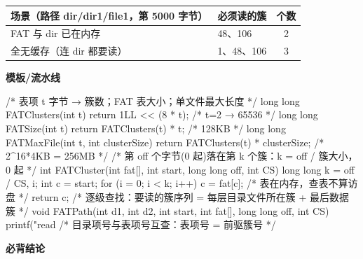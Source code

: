 \documentclass[10pt,a4paper]{ctexart}
\begin{document}
\begin{center}\small
\begin{tabularx}{\linewidth}{@{}>{\raggedright\arraybackslash}Xlc@{}}
\toprule
场景（路径 dir/dir1/file1，第 5000 字节） & 必须读的簇 & 个数 \\
\midrule
FAT 与 dir 已在内存 & 48、106 & 2 \\
全无缓存（连 dir 都要读） & 1、48、106 & 3 \\
\bottomrule
\end{tabularx}
\end{center}

\textbf{模板/流水线}

\begin{codebox}
/* 表项 t 字节 → 簇数；FAT 表大小；单文件最大长度 */
long long FATClusters(int t) { return 1LL << (8 * t); }        /* t=2 → 65536 */
long long FATSize(int t)     { return FATClusters(t) * t; }    /* 128KB */
long long FATMaxFile(int t, int clusterSize) {
    return FATClusters(t) * clusterSize;                       /* 2^16*4KB = 256MB */
}
/* 第 off 个字节(0 起)落在第 k 个簇：k = off / 簇大小，0 起 */
int FATCluster(int fat[], int start, long long off, int CS) {
    long long k = off / CS, i;
    int c = start;
    for (i = 0; i < k; i++) c = fat[c];   /* 表在内存，查表不算访盘 */
    return c;
}
/* 逐级查找：要读的簇序列 = 每层目录文件所在簇 + 最后数据簇 */
void FATPath(int d1, int d2, int start, int fat[], long long off, int CS) {
    printf("read %
}
/* 目录项号与表项号互查：表项号 = 前驱簇号 */
\end{codebox}




\textbf{必背结论}
\end{document}
